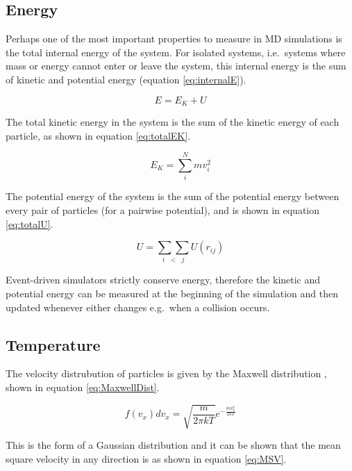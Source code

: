 \documentclass[12pt]{UoAthesis}
\begin{document}
\subsection{Energy}
Perhaps one of the most important properties to measure in MD
simulations is the total internal energy of the system.  For isolated
systems, i.e.\ systems where mass or energy cannot enter or leave the
system, this internal energy is the sum of kinetic and potential
energy (equation \eqref{eq:internalE}).

\begin{equation}
  E = E_K + U \label{eq:internalE}
\end{equation}

The total kinetic energy in the system is the sum of the kinetic
energy of each particle, as shown in equation \eqref{eq:totalEK}.

\begin{equation}
  \label{eq:totalEK}
  E_K = \sum_i^N mv_i^2
\end{equation}

The potential energy of the system is the sum of the potential energy
between every pair of particles (for a pairwise potential), and is
shown in equation \eqref{eq:totalU}.

\begin{equation}
  \label{eq:totalU}
  U = \underset{i\;\;<\;\;j}{\sum\sum}U(r_{ij})
\end{equation}

Event-driven simulators strictly conserve energy, therefore the
kinetic and potential energy can be measured at the beginning of the
simulation and then updated whenever either changes e.g.\ when a
collision occurs.

\subsection{Temperature}

The velocity distrubution of particles is given by the Maxwell
distribution \cite{Haile1997}, shown in equation
\eqref{eq:MaxwellDist}.

\begin{equation}
  \label{eq:MaxwellDist}
  f(v_x)dv_x = \sqrt{\frac{m}{2\pi kT}}e^{-\frac{mv_x^2}{2kT}} 
\end{equation}

This is the form of a Gaussian distribution and it can be shown
\cite{Landau1968} that the mean square velocity in any direction is as
shown in equation \eqref{eq:MSV}.
\end{document}
